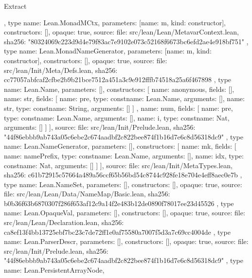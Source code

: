\begin{lexlean}{Extract}
\begin{toolingmodule}
{{{      }
    },
    type{
      name: Lean.MonadMCtx,
      parameters: [{name: m, kind: constructor{}}],
      constructors: [],
      opaque: true,
      source: {
        file: src/lean/Lean/MetavarContext.lean,
        sha256: "80324069c223d9d4e79f83ac7e9102e073c52168f6673bc6efd2ae4e918bf751"
      }
    },
    type{
      name: Lean.MonadNameGenerator,
      parameters: [{name: m, kind: constructor{}}],
      constructors: [],
      opaque: true,
      source: {
        file: src/lean/Init/Meta/Defs.lean,
        sha256: cc77057abfcaf2cfbe2b9b21bce7512a451a3c9e912fffb74518a25a6f467898
      }
    },
    type{
      name: Lean.Name,
      parameters: [],
      constructors: [
        {name: anonymous, fields: []},
        {
          name: str,
          fields: [
            {name: pre, type: const{name: Lean.Name, arguments: []}},
            {name: str, type: const{name: String, arguments: []}}
          ]
        },
        {
          name: num,
          fields: [
            {name: pre, type: const{name: Lean.Name, arguments: []}},
            {name: i, type: const{name: Nat, arguments: []}}
          ]
        }
      ],
      source: {
        file: src/lean/Init/Prelude.lean,
        sha256: "44f86ebbb9ab743a05c6ebe2c674aadbf2c822bee874f1b16d7e6c8d56318dc9"
      }
    },
    type{
      name: Lean.NameGenerator,
      parameters: [],
      constructors: [
        {
          name: mk,
          fields: [
            {name: namePrefix, type: const{name: Lean.Name, arguments: []}},
            {name: idx, type: const{name: Nat, arguments: []}}
          ]
        }
      ],
      source: {
        file: src/lean/Init/MetaTypes.lean,
        sha256: c61b72915c57664a489a56ccf65b56bd54c8744c928fe18e704e4eff8aec0e7b
      }
    },
    type{
      name: Lean.NameSet,
      parameters: [],
      constructors: [],
      opaque: true,
      source: {
        file: src/lean/Lean/Data/NameMap/Basic.lean,
        sha256: b0b36f63b6870307f286f653af12c9a14f2e483b12de0890f78017ee23d45526
      }
    },
    type{
      name: Lean.OpaqueVal,
      parameters: [],
      constructors: [],
      opaque: true,
      source: {
        file: src/lean/Lean/Declaration.lean,
        sha256: ca8ef13f4bb13725ebf7bc23c7de72ff1e0af75580a7007f5d3a7c69cc4004de
      }
    },
    type{
      name: Lean.ParserDescr,
      parameters: [],
      constructors: [],
      opaque: true,
      source: {
        file: src/lean/Init/Prelude.lean,
        sha256: "44f86ebbb9ab743a05c6ebe2c674aadbf2c822bee874f1b16d7e6c8d56318dc9"
      }
    },
    type{
      name: Lean.PersistentArrayNode,
}}
\end{toolingmodule}
\end{lexlean}
